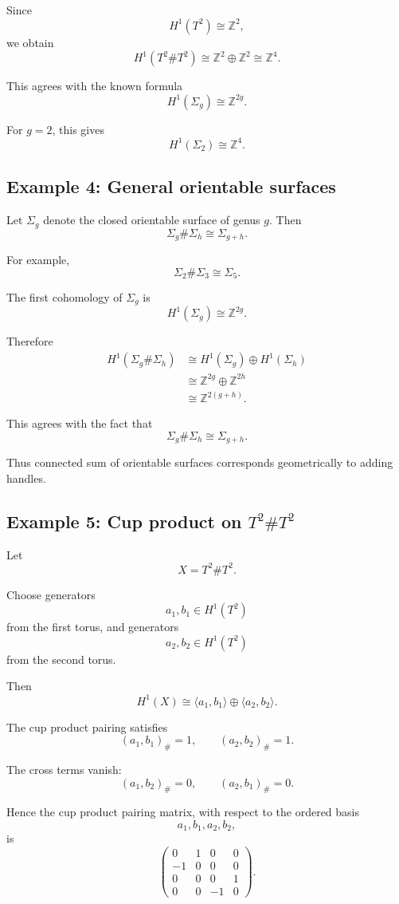 \documentclass[12pt,a4paper]{article}
\theoremstyle{notespace}
\begin{document}
Since
\[
H^1(T^2)\cong \mathbb{Z}^2,
\]
we obtain
\[
H^1(T^2\#T^2)
\cong
\mathbb{Z}^2\oplus \mathbb{Z}^2
\cong
\mathbb{Z}^4.
\]

This agrees with the known formula
\[
H^1(\Sigma_g)\cong \mathbb{Z}^{2g}.
\]

For \(g=2\), this gives
\[
H^1(\Sigma_2)\cong \mathbb{Z}^4.
\]

\subsection{Example 4: General orientable surfaces}

Let \(\Sigma_g\) denote the closed orientable surface of genus \(g\). Then
\[
\Sigma_g\#\Sigma_h\cong \Sigma_{g+h}.
\]

For example,
\[
\Sigma_2\#\Sigma_3\cong \Sigma_5.
\]

The first cohomology of \(\Sigma_g\) is
\[
H^1(\Sigma_g)\cong \mathbb{Z}^{2g}.
\]

Therefore
\[
\begin{aligned}
	H^1(\Sigma_g\#\Sigma_h)
	&\cong
	H^1(\Sigma_g)\oplus H^1(\Sigma_h)       \\
	&\cong
	\mathbb{Z}^{2g}\oplus \mathbb{Z}^{2h}   \\
	&\cong
	\mathbb{Z}^{2(g+h)}.
\end{aligned}
\]

This agrees with the fact that
\[
\Sigma_g\#\Sigma_h\cong \Sigma_{g+h}.
\]

Thus connected sum of orientable surfaces corresponds geometrically to adding
handles.

\subsection{Example 5: Cup product on \texorpdfstring{$T^2\# T^2$}{T2 connected sum T2}}

Let
\[
X=T^2\#T^2.
\]

Choose generators
\[
a_1,b_1\in H^1(T^2)
\]
from the first torus, and generators
\[
a_2,b_2\in H^1(T^2)
\]
from the second torus.

Then
\[
H^1(X)
\cong
\langle a_1,b_1\rangle
\oplus
\langle a_2,b_2\rangle.
\]

The cup product pairing satisfies
\[
(a_1,b_1)_{\#}=1,
\qquad
(a_2,b_2)_{\#}=1.
\]

The cross terms vanish:
\[
(a_1,b_2)_{\#}=0,
\qquad
(a_2,b_1)_{\#}=0.
\]

Hence the cup product pairing matrix, with respect to the ordered basis
\[
a_1,b_1,a_2,b_2,
\]
is
\[
\begin{pmatrix}
	0 & 1 & 0 & 0\\
	-1 & 0 & 0 & 0\\
	0 & 0 & 0 & 1\\
	0 & 0 & -1 & 0
\end{pmatrix}.
\]
\end{document}
